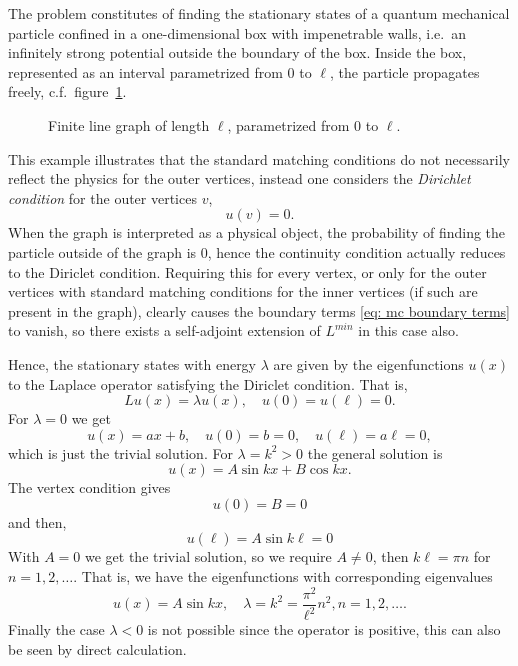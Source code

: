 \begin{example}\label{ex: particle in a box}
  The problem constitutes of finding the stationary states of a quantum mechanical particle confined in a one-dimensional box with impenetrable walls, i.e.\ an infinitely strong potential outside the boundary of the box. Inside the box, represented as an interval parametrized from 0 to $\ell$, the particle propagates freely, c.f.\ figure~\ref{fig: finite line graph}.

  \begin{figure}[!h]
   \centering
    \caption{Finite line graph of length $\ell$, parametrized from $0$ to $\ell$.}
    \label{fig: finite line graph}
  \end{figure}

  This example illustrates that the standard matching conditions do not necessarily reflect the physics for the outer vertices, instead one considers the \emph{Dirichlet condition} for the outer vertices $v$,
  \[ u(v) = 0. \]
  When the graph is interpreted as a physical object, the probability of finding the particle outside of the graph is 0, hence the continuity condition actually reduces to the Diriclet condition. Requiring this for every vertex, or only for the outer vertices with standard matching conditions for the inner vertices (if such are present in the graph), clearly causes the boundary terms \ref{eq: mc boundary terms} to vanish, so there exists a self-adjoint extension of $L^{min}$ in this case also.

  Hence, the stationary states with energy $\lambda$ are given by the eigenfunctions $u(x)$ to the Laplace operator satisfying the Diriclet condition. That is,
  \[ Lu(x) = \lambda u(x), \quad u(0) = u(\ell) = 0. \]
  For $\lambda = 0$ we get
  \[ u(x) = ax + b, \quad u(0) = b = 0, \quad u(\ell) = a\ell = 0, \]
  which is just the trivial solution.
  For $\lambda = k^2 > 0$ the general solution is
  \[ u(x) = A \sin kx + B \cos kx. \]
  The vertex condition gives
  \[ u(0) = B = 0 \]
  and then,
  \[ u(\ell) = A \sin k\ell = 0 \]
  With $A=0$ we get the trivial solution, so we require $A \ne 0$, then $k\ell = \pi n$ for $n=1,2,\ldots$. That is, we have the eigenfunctions with corresponding eigenvalues
  \[ u(x) = A \sin kx, \quad \lambda = k^2 = \frac{\pi^2}{\ell^2}n^2, n=1,2,\ldots. \]
  Finally the case $\lambda < 0$ is not possible since the operator is positive, this can also be seen by direct calculation.
\end{example}


